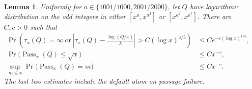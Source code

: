 \documentclass[11pt,a4paper]{article}
\newtheorem{lemma}[theorem]{Lemma}
\begin{document}
\begin{lemma}\label{lem:ct-local}
Uniformly for \(a\in\{1001/1000,2001/2000\}\), let \(Q\) have logarithmic
distribution on the odd integers in either
\([x^a,x^{a^2}]\) or \([x^{a^2},x^{a^3}]\).
There are \(C,c>0\) such that
\begin{align}
 \Pr\!\left(\tau_x(Q)=\infty\ \text{or}\
 \left|\tau_x(Q)-\frac{\log(Q/x)}{\lambda}\right|
       >C(\log x)^{3/5}\right)
 &\le C e^{-c(\log x)^{1/5}},\label{eq:ct-local-time}\\
 \Pr\bigl(\operatorname{Pass}_x(Q)\le\sqrt x\bigr)
 &\le Cx^{-c},\label{eq:ct-small-landing}\\
 \sup_{m\le x}\Pr\bigl(\operatorname{Pass}_x(Q)=m\bigr)
 &\le Cx^{-c}.\label{eq:ct-local-atoms}
\end{align}
The last two estimates include the default atom on passage failure.
\end{lemma}
\end{document}
